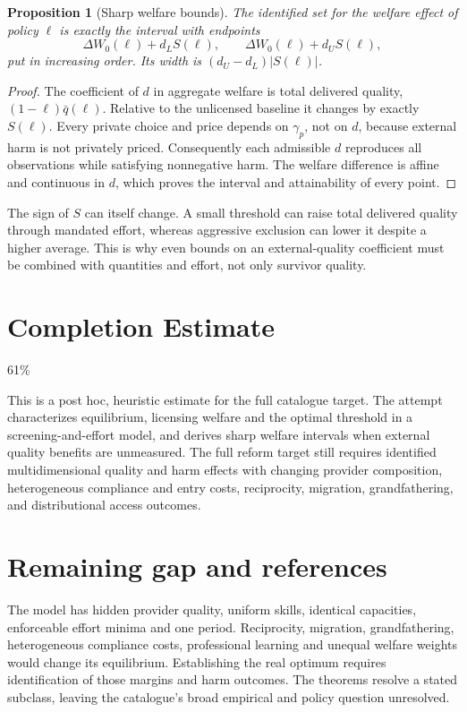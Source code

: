 \documentclass[11pt,a4paper]{article}
\newtheorem{proposition}[theorem]{Proposition}
\theoremstyle{definition}
\theoremstyle{remark}
\begin{document}
\begin{proposition}[Sharp welfare bounds]
The identified set for the welfare effect of policy $\ell$ is exactly the interval with endpoints
\[
 \Delta W_0(\ell)+d_LS(\ell),\qquad
 \Delta W_0(\ell)+d_US(\ell),
\]
put in increasing order. Its width is $(d_U-d_L)|S(\ell)|$.
\end{proposition}
\begin{proof}
The coefficient of $d$ in aggregate welfare is total delivered quality, $(1-\ell)\bar q(\ell)$. Relative to the unlicensed baseline it changes by exactly $S(\ell)$. Every private choice and price depends on $\gamma_p$, not on $d$, because external harm is not privately priced. Consequently each admissible $d$ reproduces all observations while satisfying nonnegative harm. The welfare difference is affine and continuous in $d$, which proves the interval and attainability of every point.
\end{proof}

The sign of $S$ can itself change. A small threshold can raise total delivered quality through mandated effort, whereas aggressive exclusion can lower it despite a higher average. This is why even bounds on an external-quality coefficient must be combined with quantities and effort, not only survivor quality.

\section{Completion Estimate}
61\%

This is a post hoc, heuristic estimate for the full catalogue target.
The attempt characterizes equilibrium, licensing welfare and the optimal threshold in a screening-and-effort model, and derives sharp welfare intervals when external quality benefits are unmeasured. The full reform target still requires identified multidimensional quality and harm effects with changing provider composition, heterogeneous compliance and entry costs, reciprocity, migration, grandfathering, and distributional access outcomes.

\section{Remaining gap and references}
The model has hidden provider quality, uniform skills, identical capacities, enforceable effort minima and one period. Reciprocity, migration, grandfathering, heterogeneous compliance costs, professional learning and unequal welfare weights would change its equilibrium. Establishing the real optimum requires identification of those margins and harm outcomes. The theorems resolve a stated subclass, leaving the catalogue's broad empirical and policy question unresolved.
\end{document}
